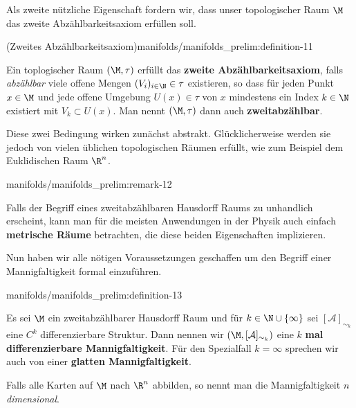 \documentclass[letterpaper,10pt,german]{jupyterBook}
\begin{document}
\par
Als zweite nützliche Eigenschaft fordern wir, dass unser topologischer Raum \(\M\) das zweite Abzählbarkeitsaxiom erfüllen soll.
\begin{definition}{(Zweites Abzählbarkeitsaxiom)}{manifolds/manifolds_prelim:definition-11}



\par
Ein toplogischer Raum \((\M, \tau)\) erfüllt das \textbf{zweite Abzählbarkeitsaxiom}, falls \emph{abzählbar} viele offene Mengen \((V_i)_{i\in\N} \in \tau\) existieren, so dass für jeden Punkt \(x\in \M\) und jede offene Umgebung \(U(x) \in \tau\) von \(x\) mindestens ein Index \(k\in\N\) existiert mit \(V_k \subset U(x)\).
Man nennt \((\M, \tau)\) dann auch \textbf{zweitabzählbar}.
\end{definition}

\par
Diese zwei Bedingung wirken zunächst abstrakt.
Glücklicherweise werden sie jedoch von vielen üblichen topologischen Räumen erfüllt, wie zum Beispiel dem Euklidischen Raum \(\R^n\).
\begin{remark}{}{manifolds/manifolds_prelim:remark-12}



\par
Falls der Begriff eines zweitabzählbaren Hausdorff Raums zu unhandlich erscheint, kann man für die meisten Anwendungen in der Physik auch einfach \textbf{metrische Räume} betrachten, die diese beiden Eigenschaften implizieren.
\end{remark}

\par
Nun haben wir alle nötigen Voraussetzungen geschaffen um den Begriff einer Mannigfaltigkeit formal einzuführen.
\begin{definition}{}{manifolds/manifolds_prelim:definition-13}



\par
Es sei \(\M\) ein zweitabzählbarer Hausdorff Raum und für \(k\in\N\cup \{\infty\}\) sei \([\mathcal{A}]_{\sim_k}\) eine \(C^k\) differenzierbare Struktur.
Dann nennen wir \((\M,[\mathcal{A}]_{\sim_k})\) eine \(k\) \textbf{mal differenzierbare Mannigfaltigkeit}.
Für den Spezialfall \(k=\infty\) sprechen wir auch von einer \textbf{glatten Mannigfaltigkeit}.

\par
Falls alle Karten auf \(\M\) nach \(\R^n\) abbilden, so nennt man die Mannigfaltigkeit \emph{\(n\) dimensional}.
\end{definition}
\end{document}
